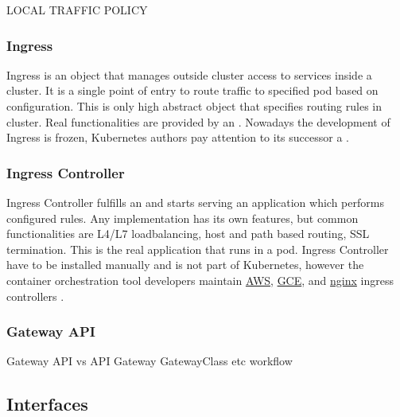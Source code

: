 LOCAL TRAFFIC POLICY

\subsubsection{Ingress}
\label{ingress}

Ingress is an object that manages outside cluster access to services inside a cluster. It is a single point of entry to route traffic to specified pod based on configuration. This is only high abstract object that specifies routing rules in cluster. Real functionalities are provided by an \textit{}. Nowadays the development of Ingress is frozen, Kubernetes authors pay attention to its successor a \textit{} \cite{KubernetesIngress}.

\subsubsection{Ingress Controller}
\label{ingresscontroller}

Ingress Controller fulfills an \textit{} and starts serving an application which performs configured rules. Any implementation has its own features, but common functionalities are L4/L7 loadbalancing, host and path based routing, SSL termination. This is the real application that runs in a pod. Ingress Controller have to be installed manually and is not part of Kubernetes, however the container orchestration tool developers maintain \href{https://github.com/kubernetes-sigs/aws-load-balancer-controller#readme}{AWS}, \href{https://github.com/kubernetes/ingress-gce/blob/master/README.md#readme}{GCE}, and \href{https://github.com/kubernetes/ingress-nginx/blob/main/README.md#readme}{nginx} ingress controllers \cite{KubernetesIngress}\cite{KubernetesIngressControllers}.

\subsubsection{Gateway API}
\label{gatewayapi}

Gateway API vs API Gateway
GatewayClass etc workflow


\subsection{Interfaces}    
\label{sec:k8s_interfaces}

